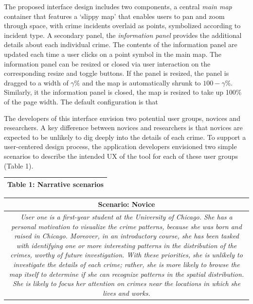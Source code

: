\documentclass[]{article}
\begin{document}
The proposed interface design includes two components, a central
\emph{main map} container that features a `slippy map' that enables
users to pan and zoom through space, with crime incidents overlaid as
points, symbolized according to incident type. A secondary panel, the
\emph{information panel} provides the additional details about each
individual crime. The contents of the information panel are updated each
time a user clicks on a point symbol in the main map. The information
panel can be resized or closed via user interaction on the corresponding
resize and toggle buttons. If the panel is resized, the panel is dragged
to a width of \(\gamma\%\) and the map is automatically shrunk to
\(100-\gamma\%\). Similarly, it the information panel is closed, the map
is resized to take up 100\% of the page width. The default configuration
is that

The developers of this interface envision two potential user groups,
novices and researchers. A key difference between novices and
researchers is that novices are expected to be unlikely to dig deeply
into the details of each crime. To support a user-centered design
process, the application developers envisioned two simple scenarios to
describe the intended UX of the tool for each of these user groups
(Table 1).

\begin{longtable}[]{@{}c@{}}
\toprule
Table 1: Narrative scenarios\tabularnewline
\midrule
\endhead
\bottomrule
\end{longtable}

\begin{longtable}[]{@{}c@{}}
\toprule
\begin{minipage}[b]{0.97\columnwidth}\centering\strut
Scenario: Novice\strut
\end{minipage}\tabularnewline
\midrule
\endhead
\begin{minipage}[t]{0.97\columnwidth}\centering\strut
\emph{User one is a first-year student at the University of Chicago. She
has a personal motivation to visualize the crime patterns, because she
was born and raised in Chicago. Moreover, in an introductory course, she
has been tasked with identifying one or more interesting patterns in the
distribution of the crimes, worthy of future investigation. With these
priorities, she is unlikely to investigate the details of each crime;
rather, she is more likely to browse the map itself to determine if she
can recognize patterns in the spatial distribution. She is likely to
focus her attention on crimes near the locations in which she lives and
works. }\strut
\end{minipage}\tabularnewline
\bottomrule
\end{longtable}
\end{document}
